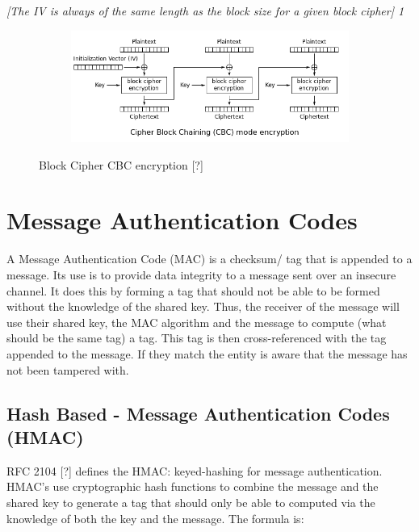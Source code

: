 \documentclass[bsc,frontabs,twoside,singlespacing,parskip,deptreport]{infthesis}     %
\begin{document}
\textit{[The IV is always of the same length as the block size for a given block cipher] 1}

\begin{figure}[H]
\centering
\begin{subfigure}{1.0\textwidth}
  \includegraphics[width=1\linewidth]
  {images/crypto/cbc.png}
\end{subfigure}
\caption{Block Cipher CBC encryption [?]}
\end{figure}

\section{Message Authentication Codes}

A Message Authentication Code (MAC) is a checksum/ tag that is appended to a message. Its use is to provide data integrity to a message sent over an insecure channel. It does this by forming a tag that should not be able to be formed without the knowledge of the shared key. Thus, the receiver of the message will use their shared key, the MAC algorithm and the message to compute (what should be the same tag) a tag. This tag is then cross-referenced with the tag appended to the message. If they match the entity is aware that the message has not been tampered with.

\subsection{Hash Based - Message Authentication Codes (HMAC)}

RFC 2104 [?] defines the HMAC: keyed-hashing for message authentication. HMAC's use cryptographic hash functions to combine the message and the shared key to generate a tag that should only be able to computed via the knowledge of both the key and the message. The formula is:
\end{document}
